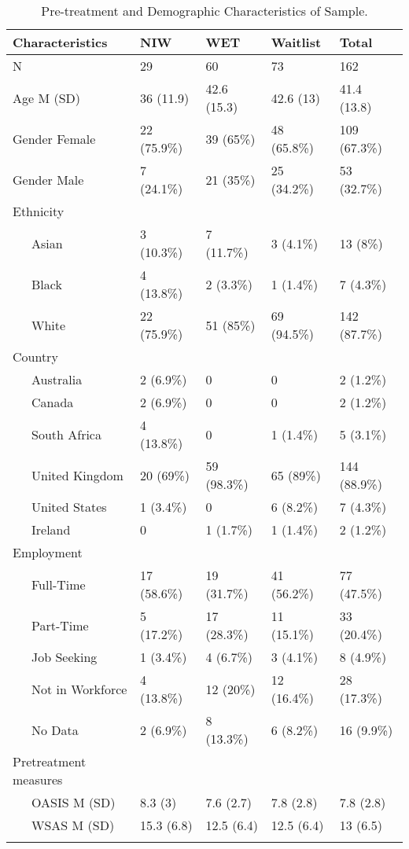 \documentclass[
  man,floatsintext]{apa7}
\begin{document}
\begin{table}[tbp]

\begin{center}
\begin{threeparttable}

\caption{\label{tab:demographics}Pre-treatment and Demographic Characteristics of Sample.}

\begin{tabular}{lllll}
\toprule
Characteristics & NIW & WET & Waitlist & Total\\
\midrule
N & 29 & 60 & 73 & 162\\
Age M (SD) & 36 (11.9) & 42.6 (15.3) & 42.6 (13) & 41.4 (13.8)\\
Gender Female & 22 (75.9\%) & 39 (65\%) & 48 (65.8\%) & 109 (67.3\%)\\
Gender Male & 7 (24.1\%) & 21 (35\%) & 25 (34.2\%) & 53 (32.7\%)\\
Ethnicity &  &  &  & \\
\ \ \ Asian & 3 (10.3\%) & 7 (11.7\%) & 3 (4.1\%) & 13 (8\%)\\
\ \ \ Black & 4 (13.8\%) & 2 (3.3\%) & 1 (1.4\%) & 7 (4.3\%)\\
\ \ \ White & 22 (75.9\%) & 51 (85\%) & 69 (94.5\%) & 142 (87.7\%)\\
Country &  &  &  & \\
\ \ \ Australia & 2 (6.9\%) & 0 & 0 & 2 (1.2\%)\\
\ \ \ Canada & 2 (6.9\%) & 0 & 0 & 2 (1.2\%)\\
\ \ \ South Africa & 4 (13.8\%) & 0 & 1 (1.4\%) & 5 (3.1\%)\\
\ \ \ United Kingdom & 20 (69\%) & 59 (98.3\%) & 65 (89\%) & 144 (88.9\%)\\
\ \ \ United States & 1 (3.4\%) & 0 & 6 (8.2\%) & 7 (4.3\%)\\
\ \ \ Ireland & 0 & 1 (1.7\%) & 1 (1.4\%) & 2 (1.2\%)\\
Employment &  &  &  & \\
\ \ \ Full-Time & 17 (58.6\%) & 19 (31.7\%) & 41 (56.2\%) & 77 (47.5\%)\\
\ \ \ Part-Time & 5 (17.2\%) & 17 (28.3\%) & 11 (15.1\%) & 33 (20.4\%)\\
\ \ \ Job Seeking & 1 (3.4\%) & 4 (6.7\%) & 3 (4.1\%) & 8 (4.9\%)\\
\ \ \ Not in Workforce & 4 (13.8\%) & 12 (20\%) & 12 (16.4\%) & 28 (17.3\%)\\
\ \ \ No Data & 2 (6.9\%) & 8 (13.3\%) & 6 (8.2\%) & 16 (9.9\%)\\
Pretreatment measures &  &  &  & \\
\ \ \ OASIS M (SD) & 8.3 (3) & 7.6 (2.7) & 7.8 (2.8) & 7.8 (2.8)\\
\ \ \ WSAS M (SD) & 15.3 (6.8) & 12.5 (6.4) & 12.5 (6.4) & 13 (6.5)\\
\bottomrule
\addlinespace
\end{tabular}


\end{threeparttable}
\end{center}
\end{table}
\end{document}
